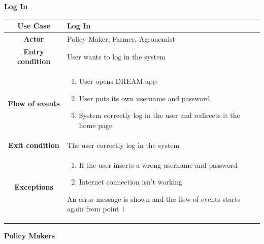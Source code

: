 \documentclass[table, 12pt]{article}
\begin{document}
\begin{itemize}
            \begin{table}[H]
                \item[] \textbf{Log In}
                \item[]  
                \centering
                \begin{tabular}{|c| m{}|}
                    \hline
                    \textbf{Use Case} & Log In\\ \hline
                    \textbf{Actor} & Policy Maker, Farmer, Agronomist\\ \hline
                    \textbf{Entry condition} & User wants to log in the system\\  \hline
                    \textbf{Flow of events} & \begin{enumerate}
                                                \item User opens DREAM app
                                                \item User puts its own username and password
                                                \item System correctly log in the user and redirects it the home page
                                            \end{enumerate}\\ \hline
                    \textbf{Exit condition} & The user correctly log in the system\\ \hline
                    \textbf{Exceptions} &  \begin{enumerate}
                        \item If the user inserts a wrong username and password
                        \item Internet connection isn't working
                    \end{enumerate}
                    An error message is shown and the flow of events starts again from point 1\\ \hline                    
                \end{tabular}
            \end{table}

            \newpage
            \item \textbf{Policy Makers}
            

\end{itemize}
\end{document}

